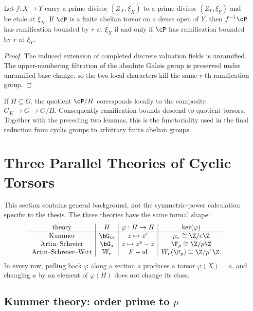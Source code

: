 \begin{lemma}\label{lemma:descend_ramification_along_etale}
Let $f:X\to Y$ carry a prime divisor $(Z_X,\xi_X)$ to a prime divisor
$(Z_Y,\xi_Y)$ and be etale at $\xi_X$. If $\cP$ is a finite abelian torsor on
a dense open of $Y$, then $f^{-1}\cP$ has ramification bounded by $r$ at
$\xi_X$ if and only if $\cP$ has ramification bounded by $r$ at $\xi_Y$.
\end{lemma}
\begin{proof}
The induced extension of completed discrete valuation fields is unramified.
The upper-numbering filtration of the absolute Galois group is preserved under
unramified base change, so the two local characters kill the same $r$-th
ramification group.
\end{proof}

If $H\subseteq G$, the quotient $\cP/H$ corresponds locally to the composite
$G_K\to G\to G/H$. Consequently ramification bounds descend to quotient
torsors. Together with the preceding two lemmas, this is the functoriality used
in the final reduction from cyclic groups to arbitrary finite abelian groups.

\section{Three Parallel Theories of Cyclic Torsors}

This section contains general background, not the symmetric-power calculation
specific to the thesis. The three theories have the same formal shape:
\[
\begin{array}{c|c|c|c}
\text{theory}&H&\varphi:H\to H&\ker(\varphi)\\ \hline
\text{Kummer}&\bG_m&z\mapsto z^e&\mu_e\cong\Z/e\Z\\
\text{Artin--Schreier}&\bG_a&z\mapsto z^p-z&\F_p\cong\Z/p\Z\\
\text{Artin--Schreier--Witt}&\bW_r&F-\mathrm{id}&W_r(\F_p)\cong\Z/p^r\Z.
\end{array}
\]
In every row, pulling back $\varphi$ along a section $a$ produces a torsor
$\varphi(X)=a$, and changing $a$ by an element of $\varphi(H)$ does not change
its class.

\subsection{\texorpdfstring{Kummer theory: order prime to $p$}{Kummer theory: order prime to p}}

